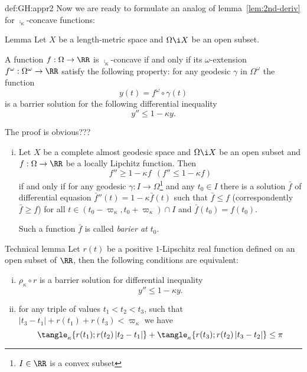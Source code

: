 {\begin{subthm}{def:GH:appr2}
Now we are ready to formulate an analog of lemma~\ref{lem:2nd-deriv} for $\comp_\kappa$-concave functions:

\begin{thm}{Lemma}\label{lem:2nd-deriv-comp_k}
Let $X$ be a length-metric space and $\Omega\i X$ be an open subset.

A function $f:\Omega\to \RR$ is $\comp_\kappa$-concave if and only if its $\omega$-extension $f^\omega:\Omega^\omega\to \RR$ satisfy the following property: for any geodesic $\gamma$ in $\Omega^\omega$ the function
$$y(t)= f^\omega\circ\gamma(t)$$ 
is a barrier solution for the following differential inequality
$$y''\le 1-\kappa y.$$
\end{thm}

The proof is obvious???











\begin{enumerate}[(i)]
\item Let $X$ be a complete almost geodesic space and $\Omega\i X$ be an open subset and $f:\Omega\to\RR$ be a locally Lipchitz function. Then 
$$f''\ge 1-\kappa f\ \  (f''\le 1-\kappa f)$$ 
if and only if for any geodesic $\gamma:I\to\Omega$\footnote{$I\in\RR$ is a convex subset} and any $t_0\in I$ there is a solution $\bar f$ of differential equasion $\bar f''(t)=1-\kappa \bar f(t)$ such that $\bar f\le f$ (correspondently $\bar f\ge f$) for all $t\in (t_0-\varpi_\kappa,t_0+\varpi_\kappa)\cap I$ and $\bar f(t_0)=f(t_0)$.

Such a function $\bar f$ is called \emph{barier at $t_0$}.
\end{enumerate}

\begin{thm}{Technical lemma}\label{lem:ensen}
Let $r(t)$ be a positive $1$-Lipschitz real function defined on an open subset of $\RR$, 
then the following conditions are equivalent:
\begin{enumerate}[(i)]
\item $\rho_\kappa\circ r$ is a barrier solution for differential inequality
$$y''\le1-\kappa y.$$
\item for any triple of values $t_1<t_2<t_3$, such that $|t_3-t_1|+r(t_1)+r(t_3)<\varpi_\kappa$ we have
$$\tangle_\kappa\{r(t_1);r(t_2)\, |t_2-t_1|\}
+
\tangle_\kappa\{r(t_3);r(t_2)\, |t_3-t_2|\}\le\pi$$
\end{enumerate}


\end{thm}
\end{subthm}}
